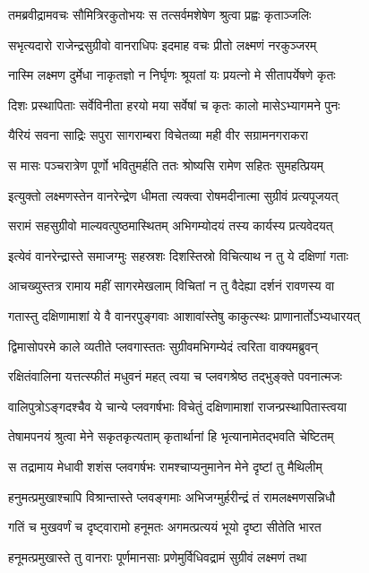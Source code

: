\twolineshloka
{तमब्रवीद्रामवचः सौमित्रिरकुतोभयः}
{स तत्सर्वमशेषेण श्रुत्वा प्रह्वः कृताञ्जलिः}


\twolineshloka
{सभृत्यदारो राजेन्द्रसुग्रीवो वानराधिपः}
{इदमाह वचः प्रीतो लक्ष्मणं नरकुञ्जरम्}


\twolineshloka
{नास्मि लक्ष्मण दुर्मेधा नाकृतज्ञो न निर्घृणः}
{श्रूयतां यः प्रयत्नो मे सीतापर्येषणे कृतः}


\twolineshloka
{दिशः प्रस्थापिताः सर्वेविनीता हरयो मया}
{सर्वेषां च कृतः कालो मासेऽभ्यागमने पुनः}


\twolineshloka
{यैरियं सवना साद्रिः सपुरा सागराम्बरा}
{विचेतव्या मही वीर सग्रामनगराकरा}


\twolineshloka
{स मासः पञ्चरात्रेण पूर्णो भवितुमर्हति}
{ततः श्रोष्यसि रामेण सहितः सुमहत्प्रियम्}


\twolineshloka
{इत्युक्तो लक्ष्मणस्तेन वानरेन्द्रेण धीमता}
{त्यक्त्वा रोषमदीनात्मा सुग्रीवं प्रत्यपूजयत्}


\twolineshloka
{सरामं सहसुग्रीवो माल्यवत्पुष्ठमास्थितम्}
{अभिगम्योदयं तस्य कार्यस्य प्रत्यवेदयत्}


\twolineshloka
{इत्येवं वानरेन्द्रास्ते समाजग्मुः सहस्रशः}
{दिशस्तिस्रो विचित्याथ न तु ये दक्षिणां गताः}


\twolineshloka
{आचख्युस्तत्र रामाय महीं सागरमेखलाम्}
{विचितां न तु वैदेह्या दर्शनं रावणस्य वा}


\twolineshloka
{गतास्तु दक्षिणामाशां ये वै वानरपुङ्गवाः}
{आशावांस्तेषु काकुत्स्थः प्राणानार्तोऽभ्यधारयत्}


\twolineshloka
{द्विमासोपरमे काले व्यतीते प्लवगास्ततः}
{सुग्रीवमभिगम्येदं त्वरिता वाक्यमब्रुवन्}


\twolineshloka
{रक्षितंवालिना यत्तत्स्फीतं मधुवनं महत्}
{त्वया च प्लवगश्रेष्ठ तद्भुङ्क्ते पवनात्मजः}


\twolineshloka
{वालिपुत्रोऽङ्गदश्चैव ये चान्ये प्लवगर्षभाः}
{विचेतुं दक्षिणामाशां राजन्प्रस्थापितास्त्वया}


\twolineshloka
{तेषामपनयं श्रुत्वा मेने सकृतकृत्यताम्}
{कृतार्थानां हि भृत्यानामेतद्भवति चेष्टितम्}


\twolineshloka
{स तद्रामाय मेधावी शशंस प्लवगर्षभः}
{रामश्चाप्यनुमानेन मेने दृष्टां तु मैथिलीम्}


\twolineshloka
{हनुमत्प्रमुखाश्चापि विश्रान्तास्ते प्लवङ्गमाः}
{अभिजग्मुर्हरीन्द्रं तं रामलक्ष्मणसन्निधौ}


\twolineshloka
{गतिं च मुखवर्णं च दृष्ट्वारामो हनूमतः}
{अगमत्प्रत्ययं भूयो दृष्टा सीतेति भारत}


\twolineshloka
{हनूमत्प्रमुखास्ते तु वानराः पूर्णमानसाः}
{प्रणेमुर्विधिवद्रामं सुग्रीवं लक्ष्मणं तथा}


